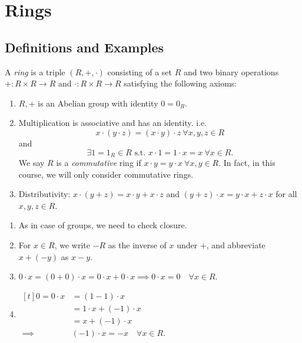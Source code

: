 \section{Rings}
\subsection{Definitions and Examples}
\leavevmode
\begin{definition}
    A \textit{ring} is a triple \((R, + , \cdot)\) consisting of a set \(R\) and two binary operations \(+: R \times R \to R\) and \(\cdot: R \times R \to R\) satisfying the following axioms:
    \begin{enumerate}
        \item \(R, +\) is an Abelian group with identity \(0 = 0_R\).
        \item Multiplication is associative and has an identity. i.e.
        \[x\cdot(y\cdot z) = (x\cdot y)\cdot z~\forall x,y,z\in R\]
        and
        \[\exists 1=1_{R} \in R \text{ s.t. } x\cdot 1 = 1 \cdot x = x~\forall x\in R.\]
        We say \(R\) is a \textit{commutative} ring if \(x \cdot y = y \cdot x~\forall x,y \in R\). In fact, in this course, we will only consider commutative rings.
        \item Distributivity: \(x \cdot (y + z) = x \cdot y + x \cdot z\) and \((y + z)\cdot x = y \cdot x + z \cdot x\) for all \(x, y, z \in R\).
    \end{enumerate}
\end{definition}
\begin{remark}
    \leavevmode
    \begin{enumerate}
        \item As in case of groups, we need to check closure.
        \item For \(x\in R\), we write \(-R\) as the inverse of \(x\) under \(+\), and abbreviate \(x + (-y)\) as \(x - y\).
        \item \(0 \cdot x = (0 + 0)\cdot x = 0 \cdot x + 0 \cdot x \implies 0 \cdot x = 0\quad\forall x \in R\).
        \item \(\begin{aligned}[t]
            0 = 0\cdot x &= (1-1)\cdot x\\
            &= 1\cdot x + (-1)\cdot x\\
            &= x + (-1)\cdot x\\
            \implies& (-1)\cdot x = -x\quad \forall x \in R.
        \end{aligned}\) 
    \end{enumerate}
\end{remark}
